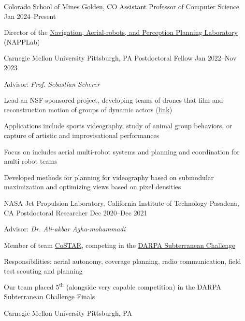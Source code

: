 
\begin{cventries}
  \cventry
  {Colorado School of Mines}
  {Golden, CO}
  {Assistant Professor of Computer Science}
  {Jan 2024--Present}
  {
    \begin{cvitems}
      \item Director of the
        \href{https://www.napplab.org/}{Navigation, Aerial-robots, and Perception Planning Laboratory}
        (NAPPLab)
    \end{cvitems}
  }
  \cventry
  {Carnegie Mellon University}
  {Pittsburgh, PA}
  {Postdoctoral Fellow}
  {Jan 2022--Nov 2023}
  {
    Advisor: \emph{Prof. Sebastian Scherer}\linebreak
    \begin{cvitems}
    \item Lead an NSF-sponsored project, developing teams of drones that
      film and reconstruction motion of groups of dynamic actors
      (\href{https://theairlab.org/multidrone/}{link})
    \item Applications include sports videography, study of animal
      group behaviors, or capture of artistic and improvisational performances
    \item Focus on includes aerial multi-robot systems and
      planning and coordination for multi-robot teams
    \item Developed methods for planning for videography based on submodular
      maximization and optimizing views based on pixel densities
    \end{cvitems}
  }
  \cventry
  {NASA Jet Propulsion Laboratory, California Institute of Technology}
  {Pasadena, CA}
  {Postdoctoral Researcher}
  {Dec 2020--Dec 2021}
  {
    Advisor: \emph{Dr. Ali-akbar Agha-mohammadi}\linebreak
    \begin{cvitems}
    \item Member of team \href{https://costar.jpl.nasa.gov/}{CoSTAR}, competing in the
      \href{https://www.subtchallenge.com/}{DARPA Subterranean Challenge}
    \item Responsibilities:
      aerial autonomy, coverage planning, radio communication,
      field test scouting and planning
    \item Our team placed $5^\mathrm{th}$ (alongside very capable competition)
      in the DARPA Subterranean Challenge Finals
    \end{cvitems}
  }
  \cventry
  {Carnegie Mellon University}
  {Pittsburgh, PA}

\end{cventries}
